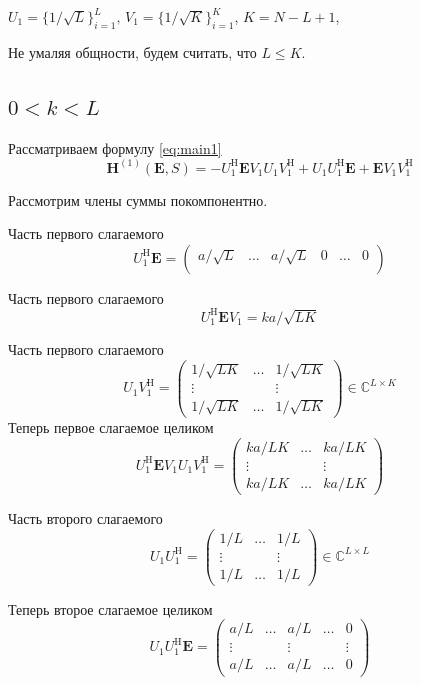 \documentclass[specialist,
               substylefile = spbu.rtx,
               subf,href,colorlinks=true, 12pt]{disser}
\begin{document}
$U_1 = \{1/\sqrt{L}\}^{L}_{i = 1},\, V_1 = \{1/\sqrt{K}\}^{K}_{i = 1}$, $K = N - L + 1$, 

Не умаляя общности, будем считать, что $L \leq K$.

\subsection{$0 < k < L$}

Рассматриваем формулу \eqref{eq:main1}
$$\mathbf{H}^{(1)}(\mathbf{E}, S) = -U_1^{\mathrm{H}} \mathbf{E} V_1 U_1 V^{\mathrm{H}}_1 + U_1 U^{\mathrm{H}}_1 \mathbf{E} + \mathbf{E} V_1 V^{\mathrm{H}}_1$$

Рассмотрим члены суммы покомпонентно.

Часть первого слагаемого
$$U_1^{\mathrm{H}} \mathbf{E} = \begin{pmatrix}
	 a/\sqrt{L} & \ldots & a/\sqrt{L} & 0 & \ldots & 0\\
\end{pmatrix}$$

Часть первого слагаемого
$$U_1^{\mathrm{H}} \mathbf{E} V_1 = k a / \sqrt{LK}$$

Часть первого слагаемого
$$U_1 V_1^{\mathrm{H}} = \begin{pmatrix}
	1/\sqrt{LK} & \ldots & 1/\sqrt{LK}\\
	\vdots & & \vdots\\
	1/\sqrt{LK} &   \ldots &  1/\sqrt{LK}
\end{pmatrix}\in \mathbb{C}^{L \times K}
$$
Теперь первое слагаемое целиком
$$U_1^{\mathrm{H}} \mathbf{E} V_1 U_1 V_1^{\mathrm{H}} = \begin{pmatrix}
	k a/ LK & \ldots &  k a/ LK\\
	\vdots & & \vdots\\
	k a/ LK &   \ldots &  k a/ LK
\end{pmatrix}$$

Часть второго слагаемого
$$U_1 U_1^{\mathrm{H}} = \begin{pmatrix}
	1/L & \ldots & 1/L\\
	
	\vdots & & \vdots\\
	1/L &   \ldots &  1/L
\end{pmatrix}\in \mathbb{C}^{L \times L}$$

Теперь второе слагаемое целиком
$$U_1 U_1^{\mathrm{H}} \mathbf{E} = \begin{pmatrix}
	a/L & \ldots & a/L & \ldots & 0\\
	\vdots & & \vdots & & \vdots\\
	a/L & \ldots & a/L & \ldots & 0
\end{pmatrix}$$
\end{document}
